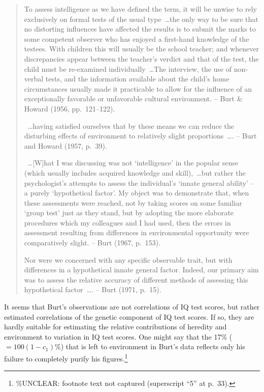 ﻿\documentclass[12pt]{article}
\begin{document}
\begin{quote}
To assess intelligence as we have defined the term, it will be unwise to rely exclusively on formal tests of the usual type~\ldots the only way to be sure that no distorting influences have affected the results is to submit the marks to some competent observer who has enjoyed a first-hand knowledge of the testees. With children this will usually be the school teacher; and whenever discrepancies appear between the teacher's verdict and that of the test, the child must be re-examined individually~\ldots The interview, the use of non-verbal tests, and the information available about the child's home circumstances usually made it practicable to allow for the influence of an exceptionally favorable or unfavorable cultural environment. -- Burt \& Howard (1956, pp.\ 121--122).

~\ldots having satisfied ourselves that by these means we can reduce the disturbing effects of environment to relatively slight proportions~\ldots. -- Burt and Howard (1957, p.\ 39).

~\ldots [W]hat I was discussing was not `intelligence' in the popular sense (which usually includes acquired knowledge and skill),~\ldots but rather the psychologist's attempts to assess the individual's `innate general ability' -- a purely `hypothetical factor'. My object was to demonstrate that, when these assessments were reached, not by taking scores on some familiar `group test' just as they stand, but by adopting the more elaborate procedures which my colleagues and I had used, then the errors in assessment resulting from differences in environmental opportunity were comparatively slight. -- Burt (1967, p.\ 153).

Nor were we concerned with any specific observable trait, but with differences in a hypothetical innate general factor. Indeed, our primary aim was to assess the relative accuracy of different methods of assessing this hypothetical factor~\ldots. -- Burt (1971, p.\ 15).
\end{quote}

It seems that Burt's observations are not correlations of IQ test scores, but rather estimated correlations of the genetic component of IQ test scores. If so, they are hardly suitable for estimating the relative contributions of heredity and environment to variation in IQ test scores. One might say that the 17\% ($=100(1-c_1)\%$) that is left to environment in Burt's data reflects only his failure to completely purify his figures.\footnote{\%UNCLEAR: footnote text not captured (superscript ``5'' at p.\ 33).}
\end{document}
